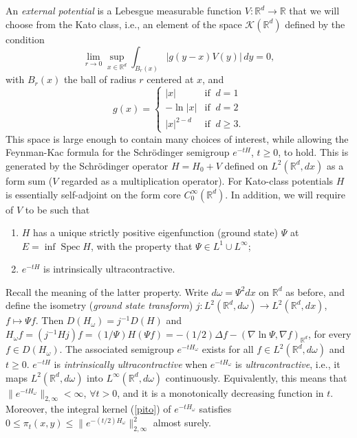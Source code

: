 \documentclass[a4paper,11pt]{article}
\newcommand{\R}{\mathbb{R}}
\newcommand{\Spec}{\mathop{\mathrm{Spec}}\nolimits}
\begin{document}
An \emph{external potential} is a Lebesgue measurable function $V: 
\R^d \to \R$ that we will choose from the Kato class, i.e., an element 
of the space $\mathcal{K}(\R^d)$ defined by the condition
%
\begin{equation}
\lim_{r \to 0} \sup_{x \in \R^d} \int_{B_r(x)} 
|g(y-x)V(y)| \, dy = 0,
\end{equation}
with $B_r(x)$ the ball of radius $r$ centered at $x$, and 
%
\begin{equation}
 g(x) = \left\{ %
\begin{array}{ll} 
        |x| & \mbox{if} \;\; d = 1 \\         
        -\ln|x| & \mbox{if} \;\; d = 2 \label{k2}\\
        |x|^{2-d} & \mbox{if}   \;\;  d \geq 3.
    \end{array} \right. 
\end{equation}
This space is large enough to contain many choices of interest,
while allowing the Feynman-Kac formula for the Schr\"odinger
semigroup $e^{-tH}$, $t \geq 0$, to hold. This is generated by  
the Schr\"odinger operator $H = H_0 + V$ defined on 
$L^2(\R^d,dx)$ as a form sum ($V$ regarded as a multiplication 
operator). For Kato-class potentials $H$ is essentially 
self-adjoint on the form core $C^\infty_0(\R^d)$. In addition, 
we will require of $V$ to be such that 
\begin{enumerate}
\item[(1)]
$H$ has a unique strictly positive eigenfunction (ground state) 
$\Psi$ at $E = \inf\Spec H$, with the property that $\Psi \in
L^1 \cup L^\infty$;
\item[(2)] 
$e^{-tH}$ is intrinsically ultracontractive.
\end{enumerate}
Recall the meaning of the latter property. Write $d\omega = \Psi^2 
dx$ on $\R^d$ as before, and define the isometry (\emph{ground 
state transform}) $j: L^2(\R^d,d\omega) \rightarrow L^2(\R^d,dx)$, 
$f \mapsto \Psi f$. Then $D(H_\omega) = j^{-1}D(H)$ and $H_\omega 
f=(j^{-1}Hj)f = (1/\Psi) H(\Psi f) = -(1/2)\Delta f-({\nabla\ln\Psi},
\nabla f)_{\R^d}$, for every $f \in D(H_\omega)$. The associated 
semigroup $e^{-tH_\omega}$ exists for all $f\in L^2(\R^d,d\omega)$ 
and $t \geq 0$. $e^{-tH}$ is \emph{intrinsically ultracontractive} 
when $e^{-tH_\omega}$ is \emph{ultracontractive}, i.e., it maps 
$L^2(\R^d, d\omega)$ into $L^\infty(\R^d,d\omega)$ continuously. 
Equivalently, this means that $\|{e^{-tH_\omega}}\|_{2,\infty} < 
\infty$, $\forall t> 0$, and it is a monotonically decreasing 
function in $t$. Moreover, the integral kernel (\ref{pito}) of 
$e^{-tH_\omega}$ satisfies $0 \leq \pi_t(x,y) \leq 
\|e^{-(t/2)H_\omega}\|_{2,\infty}^2$ almost surely.
\end{document}

